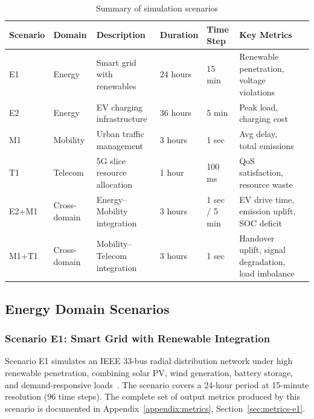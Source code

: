 \begin{table}[h]
    \centering
    \caption{Summary of simulation scenarios}
    \label{tab:scenario_summary}
    \small
    \begin{tabular}{|p{1.2cm}|p{1.8cm}|p{2.5cm}|p{1.8cm}|p{1.4cm}|p{2.8cm}|p{1.2cm}|}
        \hline
        \textbf{Scenario} & \textbf{Domain} & \textbf{Description} & \textbf{Duration} & \textbf{Time Step} & \textbf{Key Metrics} \\
        \hline
        E1 & Energy & Smart grid with renewables & 24 hours & 15 min & Renewable penetration, voltage violations \\
        \hline
        E2 & Energy & EV charging infrastructure & 36 hours & 5 min & Peak load, charging cost \\
        \hline
        M1 & Mobility & Urban traffic management & 3 hours & 1 sec & Avg delay, total emissions \\
        \hline
        T1 & Telecom & 5G slice resource allocation & 1 hour & 100 ms & QoS satisfaction, resource waste \\
        \hline
        E2+M1 & Cross-domain & Energy--Mobility integration & 3 hours & 1 sec / 5 min & EV drive time, emission uplift, SOC deficit \\
        \hline
        M1+T1 & Cross-domain & Mobility--Telecom integration & 3 hours & 1 sec & Handover uplift, signal degradation, load imbalance \\
        \hline
    \end{tabular}
\end{table}

\subsection{Energy Domain Scenarios}

\subsubsection{Scenario E1: Smart Grid with Renewable Integration}
\label{sec:scenario-e1}

Scenario E1 simulates an IEEE 33-bus radial distribution network under high renewable penetration, combining solar PV, wind generation, battery storage, and demand-responsive loads~\cite{smartgrid_challenges, renewable_integration}. The scenario covers a 24-hour period at 15-minute resolution (96 time steps). The complete set of output metrics produced by this scenario is documented in Appendix~\ref{appendix:metrics}, Section~\ref{sec:metrics-e1}.

